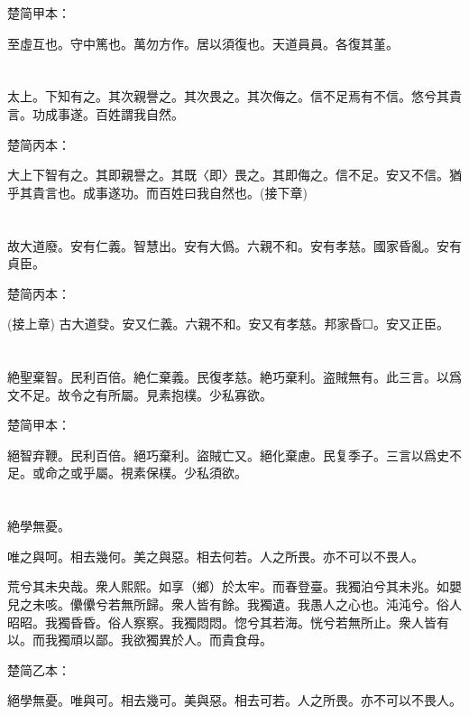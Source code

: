 \documentclass[a5paper]{ctexbook}
\begin{document}
    楚简甲本：

    至虛互也。守中篤也。萬勿方作。居以須復也。天道員員。各復其堇。

    \chapter{}

    太上。下知有之。其次親譽之。其次畏之。其次侮之。信不足焉有不信。悠兮其貴言。功成事遂。百姓謂我自然。

    楚简丙本：

    大上下智有之。其即親譽之。其既〈即〉畏之。其即侮之。信不足。安又不信。猶乎其貴言也。成事遂功。而百姓曰我自然也。(接下章)

    \chapter{}

    故大道廢。安有仁義。智慧出。安有大僞。六親不和。安有孝慈。國家昏亂。安有貞臣。

    楚简丙本：

    (接上章) 古大道癹。安又仁義。六親不和。安又有孝慈。邦家昏☐。安又正臣。

    \chapter{}

    絶聖棄智。民利百倍。絶仁棄義。民復孝慈。絶巧棄利。盗賊無有。此三言。以爲文不足。故令之有所屬。見素抱樸。少私寡欲。

    楚简甲本：

    絕智弃鞭。民利百倍。絕巧棄利。盜賊亡又。絕化棄慮。民复季子。三言以爲史不足。或命之或乎屬。視素保樸。少私須欲。

    \chapter{}

    絶學無憂。
    
    唯之與呵。相去幾何。美之與惡。相去何若。人之所畏。亦不可以不畏人。
    
    荒兮其未央哉。衆人熙熙。如享（鄉）於太牢。而春登臺。我獨泊兮其未兆。如嬰兒之未咳。儽儽兮若無所歸。衆人皆有餘。我獨遺。我愚人之心也。沌沌兮。俗人昭昭。我獨昏昏。俗人察察。我獨悶悶。惚兮其若海。恍兮若無所止。衆人皆有以。而我獨頑以鄙。我欲獨異於人。而貴食母。

    楚简乙本：

    絕學無憂。唯與可。相去幾可。美與惡。相去可若。人之所畏。亦不可以不畏人。
\end{document}
